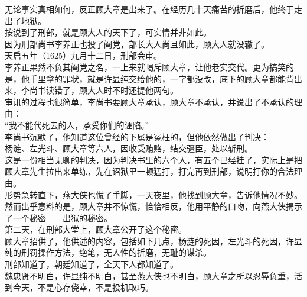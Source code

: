 \begin{multicols}{\theparacolNo}
无论事实真相如何，反正顾大章是出来了。在经历几十天痛苦的折磨后，他终于走出了地狱。\\

按说到了刑部，就是顾大人的天下了，可实情并非如此。\\

因为刑部尚书李养正也投了阉党，部长大人尚且如此，顾大人就没辙了。\\

天启五年（1625）九月十二日，刑部会审。\\

李养正果然不负其阉党之名，一上来就喝斥顾大章，让他老实交代。更为搞笑的是，他手里拿的罪状，就是许显纯交给他的，一字都没改，底下的顾大章都能背出来，李尚书读错了，顾大人时不时还提他两句。\\

审讯的过程也很简单，李尚书要顾大章承认，顾大章不承认，并说出了不承认的理由：\\

“我不能代死去的人，承受你们的诬陷。”\\

李尚书沉默了，他知道这位曾经的下属是冤枉的，但他依然做出了判决：\\

杨涟、左光斗、顾大章等六人，因收受贿赂，结交疆臣，处以斩刑。\\

这是一份相当无聊的判决，因为判决书里的六个人，有五个已经挂了，实际上是把顾大章先生拉出来单练，先在诏狱里一顿猛打，打完再到刑部，说明打你的合法理由。\\

形势急转直下，燕大侠也慌了手脚，一天夜里，他找到顾大章，告诉他情况不妙。\\

然而出乎意料的是，顾大章并不惊慌，恰恰相反，他用平静的口吻，向燕大侠揭示了一个秘密——出狱的秘密。\\

第二天，在刑部大堂上，顾大章公开了这个秘密。\\

顾大章招供了，他供述的内容，包括如下几点，杨涟的死因，左光斗的死因，许显纯的刑罚操作方法，绝笔，无人性的折磨，无耻的谋杀。\\

刑部知道了，朝廷知道了，全天下人都知道了。\\

魏忠贤不明白，许显纯不明白，甚至燕大侠也不明白，顾大章之所以忍辱负重，活到今天，不是心存侥幸，不是投机取巧。\\


\end{multicols}
